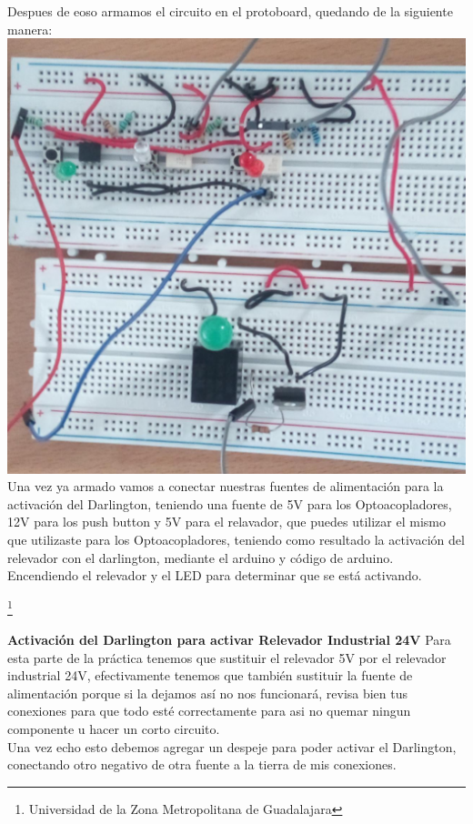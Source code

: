\documentclass[10pt,a4paper]{article}
\begin{document}
Despues de eoso armamos el circuito en el protoboard, quedando de la siguiente manera:\\

\centering
\includegraphics[scale=0.12]{5.jpeg}\\


Una vez ya armado vamos a conectar nuestras fuentes de alimentación para la activación del Darlington, teniendo una fuente de 5V para los Optoacopladores, 12V para los push button y 5V para el relavador, que puedes utilizar el mismo que utilizaste para los Optoacopladores, teniendo como resultado la activación del relevador con el darlington, mediante el arduino y código de arduino. Encendiendo el relevador y el LED para determinar que se está activando. 

\footnote{Universidad de la Zona Metropolitana de Guadalajara}

\newpage
\textbf{Activación del Darlington para activar Relevador Industrial 24V}
Para esta parte de la práctica tenemos que sustituir el relevador 5V por el relevador industrial 24V, efectivamente tenemos que también sustituir la fuente de alimentación porque si la dejamos así no nos funcionará, revisa bien tus conexiones para que todo esté correctamente para asi no quemar ningun componente u hacer un corto circuito.\\

Una vez echo esto debemos agregar un despeje para poder activar el Darlington, conectando otro negativo de otra fuente a la tierra de mis conexiones.\\
\end{document}
